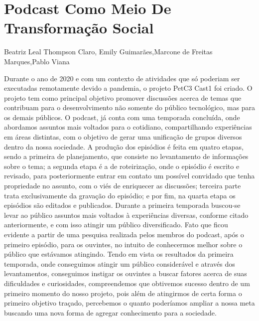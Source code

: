 


\section*{Podcast Como Meio De Transformação Social}

Beatriz Leal Thompson Claro, Emily Guimarães,Marcone de Freitas Marques,Pablo Viana

Durante o ano de 2020 e com um contexto de atividades que só poderiam ser executadas
remotamente devido a pandemia, o projeto PetC3 Cast1
foi criado. O projeto tem como principal
objetivo promover discussões acerca de temas que contribuam para o desenvolvimento não
somente do público tecnológico, mas para os demais públicos. O podcast, já conta com uma
temporada concluída, onde abordamos assuntos mais voltados para o cotidiano, compartilhando
experiências em áreas distintas, com o objetivo de gerar uma unificação de grupos diversos
dentro da nossa sociedade.
A produção dos episódios é feita em quatro etapas, sendo a primeira de planejamento,
que consiste no levantamento de informações sobre o tema; a segunda etapa é a de roteirização,
onde o episódio é escrito e revisado, para posteriormente entrar em contato um possível
convidado que tenha propriedade no assunto, com o viés de enriquecer as discussões; terceira
parte trata exclusivamente da gravação do episódio; e por fim, na quarta etapa os episódios são
editados e publicados.
Durante a primeira temporada buscou-se levar ao público assuntos mais voltados à
experiências diversas, conforme citado anteriormente, e com isso atingir um público
diversificado. Fato que ficou evidente a partir de uma pesquisa realizada pelos membros do
podcast, após o primeiro episódio, para os ouvintes, no intuito de conhecermos melhor sobre o
público que estávamos atingindo.
Tendo em vista os resultados da primeira temporada, onde conseguimos atingir um
público considerável e através dos levantamentos, conseguimos instigar os ouvintes a buscar
fatores acerca de suas dificuldades e curiosidades, compreendemos que obtivemos sucesso
dentro de um primeiro momento do nosso projeto, pois além de atingirmos de certa forma o
primeiro objetivo traçado, percebemos o quanto poderíamos ampliar a nossa meta buscando uma
nova forma de agregar conhecimento para a sociedade.



